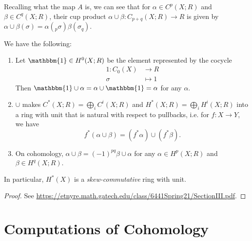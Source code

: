 \begin{remark}
  Recalling what the map $A$ is, we can see
  that for $\alpha \in C^p(X; R)$ and
  $\beta \in C^q(X; R)$, their cup product
  $\alpha \cup \beta : C_{p + q}(X; R) \to R$
  is given by $\alpha \cup \beta(\sigma) = \alpha({}_p \sigma) \beta(\sigma_q)$.
\end{remark}

\begin{theorem}
  We have the following:
  \begin{enumerate}
    \item Let $\mathbbm{1} \in H^0(X; R)$ be the element
      represented by the cocycle
      \begin{align*}
        1 : C_0(X) &\longrightarrow R \\
        \sigma &\longmapsto 1
      \end{align*}
      Then $\mathbbm{1} \cup \alpha = \alpha \cup \mathbbm{1} = \alpha$ for any $\alpha$.
    \item $\cup$ makes $C^*(X; R) = \bigoplus_i C^i(X; R)$ and
      $H^*(X; R) = \bigoplus_i H^i(X; R)$ into
      a ring with unit that is natural with
      respect to pullbacks, i.e. for
      $f : X \to Y$, we have
      \[
        f^*(\alpha \cup \beta) = (f^*\alpha) \cup (f^*\beta).
      \]
    \item On cohomology, $\alpha \cup \beta = (-1)^{pq} \beta \cup \alpha$
      for any $\alpha \in H^p(X; R)$ and $\beta \in H^q(X; R)$.
  \end{enumerate}
  In particular, $H^*(X)$ is a \emph{skew-commutative}
  ring with unit.
\end{theorem}

\begin{proof}
  See \url{https://etnyre.math.gatech.edu/class/6441Spring21/SectionIII.pdf}.
\end{proof}

\section{Computations of Cohomology}

